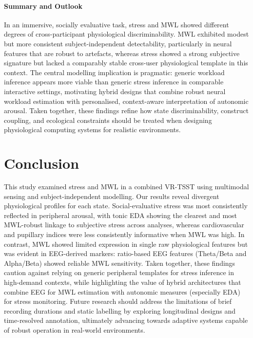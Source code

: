 \documentclass[lettersize,journal]{IEEEtran}
\begin{document}
\paragraph{Summary and Outlook}
In an immersive, socially evaluative task, stress and MWL showed different degrees of cross-participant physiological discriminability. MWL exhibited modest but more consistent subject-independent detectability, particularly in neural features that are robust to artefacts, whereas stress showed a strong subjective signature but lacked a comparably stable cross-user physiological template in this context. The central modelling implication is pragmatic: generic workload inference appears more viable than generic stress inference in comparable interactive settings, motivating hybrid designs that combine robust neural workload estimation with personalised, context-aware interpretation of autonomic arousal. Taken together, these findings refine how state discriminability, construct coupling, and ecological constraints should be treated when designing physiological computing systems for realistic environments.

\section{Conclusion}
This study examined stress and MWL in a combined VR-TSST using multimodal sensing and subject-independent modelling. Our results reveal divergent physiological profiles for each state. Social-evaluative stress was most consistently reflected in peripheral arousal, with tonic EDA showing the clearest and most MWL-robust linkage to subjective stress across analyses, whereas cardiovascular and pupillary indices were less consistently informative when MWL was high. In contrast, MWL showed limited expression in single raw physiological features but was evident in EEG-derived markers: ratio-based EEG features (Theta/Beta and Alpha/Beta) showed reliable MWL sensitivity. Taken together, these findings caution against relying on generic peripheral templates for stress inference in high-demand contexts, while highlighting the value of hybrid architectures that combine EEG for MWL estimation with autonomic measures (especially EDA) for stress monitoring. Future research should address the limitations of brief recording durations and static labelling by exploring longitudinal designs and time-resolved annotation, ultimately advancing towards adaptive systems capable of robust operation in real-world environments.
\end{document}
